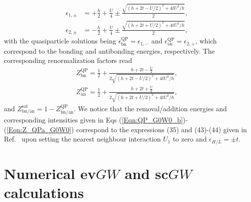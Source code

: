 \documentclass[aps,prb,reprint,superscriptaddress]{revtex4-1}
\newcommand{\eps}{\epsilon}
\newcommand{\bn}{\text{bn}}
\newcommand{\an}{\text{an}}
\begin{document}
\begin{subequations}
\begin{align}
	\eps_{1,\pm} & = + \frac{h}{2} +  \frac{U}{4} \pm \frac{\sqrt{
	(h+2t-U/2)^2 + 4 t U^2/h}}{2},
	\label{Eqn:QP_G0W0_b}
	\\
	\eps_{2,\pm} & =   -\frac{h}{2} +  \frac{U}{4} \pm \frac{\sqrt{
	(h+2t+U/2)^2+ 4 t U^2/h}}{2},
	\label{Eqn:QP_G0W0_a}
\end{align}
\end{subequations}
with the quasiparticle solutions being $\eps_\bn^\text{QP}=\eps_{1,-}$ and $\eps_\an^\text{QP}=\eps_{2,+}$, which correspond to the bonding and antibonding energies, respectively. The corresponding renormalization factors read
\begin{subequations}
\begin{align}
Z^{\text{QP}}_{\bn}=\frac{1}{2}+\frac{h+2t-\frac{U}{2}}{2\sqrt{
	(h+2t-U/2)^2 + 4 t U^2/h}},
	\label{Eqn:Z_QPb_G0W0}
	\\
	Z^{\text{QP}}_{\an}=\frac{1}{2}+\frac{h+2t+\frac{U}{2}}{2\sqrt{
	(h+2t+U/2)^2 + 4 t U^2/h}},
	\label{Eqn:Z_QPa_G0W0}
\end{align}
\end{subequations}
and $Z^{\text{sat}}_{\bn/\an}=1-Z^{\text{QP}}_{\bn/\an}$. We notice that the removal/addition energies and corresponding intensities given in Eqs (\ref{Eqn:QP_G0W0_b})-(\ref{Eqn:Z_QPa_G0W0}) correspond to the expressions (35) and (43)-(44) given in Ref.~\citep{Hellgren_2015} upon setting the nearest neighbour interaction $U_1$ to zero and $\epsilon_{H/L}=\pm t$.
\section{Numerical ev$GW$ and sc$GW$ calculations}
\label{app:meromorphic}
\end{document}
